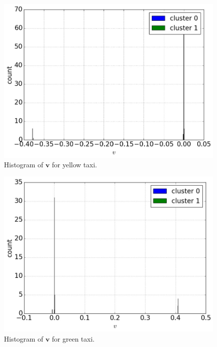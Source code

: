 \documentclass[journal]{IEEEtran}
\begin{document}
\begin{figure}[!t] 
  \centering
  \includegraphics[width=1.0\columnwidth]{./figs/hist_yellow.jpg}
  \caption{Histogram of $\mathbf{v}$ for yellow taxi.}
  \label{fig:hist_yellow}
\end{figure}
\begin{figure}[!t] 
  \centering
  \includegraphics[width=1.0\columnwidth]{./figs/hist_green.jpg}
  \caption{Histogram of $\mathbf{v}$ for green taxi.}
  \label{fig:hist_green}
\end{figure}
\end{document}
